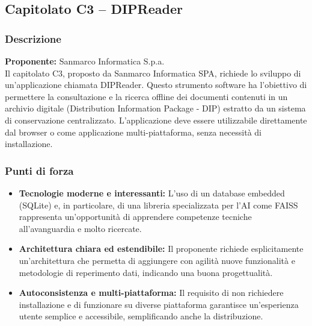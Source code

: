\documentclass{article}
\begin{document}
	\subsection{Capitolato C3 – DIPReader}
	\subsubsection{Descrizione}
    \textbf{Proponente:} Sanmarco Informatica S.p.a.\\
	Il capitolato C3, proposto da Sanmarco Informatica SPA, richiede lo sviluppo di un'applicazione chiamata DIPReader. Questo strumento software ha l'obiettivo di permettere la consultazione e la ricerca offline dei documenti contenuti in un archivio digitale (Distribution Information Package - DIP) estratto da un sistema di conservazione centralizzato. L'applicazione deve essere utilizzabile direttamente dal browser o come applicazione multi-piattaforma, senza necessità di installazione.
	
	\subsubsection{Punti di forza}
	\begin{itemize}
		\item \textbf{Tecnologie moderne e interessanti:} L'uso di un database embedded (SQLite) e, in particolare, di una libreria specializzata per l'AI come FAISS rappresenta un'opportunità di apprendere competenze tecniche all'avanguardia e molto ricercate.
		\item \textbf{Architettura chiara ed estendibile:} Il proponente richiede esplicitamente un'architettura che permetta di aggiungere con agilità nuove funzionalità e metodologie di reperimento dati, indicando una buona progettualità.
		\item \textbf{Autoconsistenza e multi-piattaforma:} Il requisito di non richiedere installazione e di funzionare su diverse piattaforma garantisce un'esperienza utente semplice e accessibile, semplificando anche la distribuzione.
    \end{itemize}
	
\end{document}
